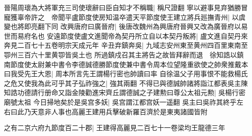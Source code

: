晉陽周瓌為大將軍充三司使瓌辭曰臣自知才不稱職|{
	稱尺證翻}
寧以避事見弃猶勝冒寵獲辜帝許之　帝聞平盧節度使房知温卒遣天平節度使王建立將兵廵撫青州|{
	以虞變也將即亮翻下同}
改興唐府曰廣晉府|{
	後唐改魏州為興唐府晉興又改為廣晉府以易世而易府名也}
安遠節度使盧文進聞帝為契丹所立自以本契丹叛將|{
	盧文進自契丹來奔見二百七十五卷明宗天成元年}
辛丑弃鎮奔吳|{
	九域志安州東至黄州四百里東南至卾州三百六十里黄卾皆吳土也}
所過鎮戍召其主將告之故皆拜辭而退　徐知誥以鎮南節度使太尉兼中書令李德誠德勝節度使兼中書令周本位望隆重欲使之帥衆推戴本曰我受先王大恩|{
	周本所言先王謂楊行密也帥讀曰率}
自徐温父子用事恨不能救楊氏之危又使我為此可乎其子弘祚強之|{
	強其兩翻}
不得已與德誠帥諸將詣江都表吳主陳知誥功德請行册命又詣金陵勸進宋齊丘謂德誠之子建勲曰尊公太祖元勲|{
	吳楊行密廟號太祖}
今日掃地矣於是吳宫多妖|{
	吳宫謂江都宫妖一遥翻}
吳主曰吳祚其終乎左右曰此乃天意非人事也高麗王建用兵擊破新羅百濟於是東夷諸國皆附

之有二京六府九節度百二十郡|{
	王建得高麗見二百七十一卷梁均王龍德三年}


